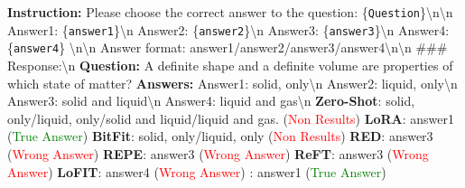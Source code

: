 \begin{tcolorbox}[colback=gray!10!white, colframe=black, title=Case 1: Commonsense Reasoning Task (ARC-c) on LLaMA-3.1-8B]
    \textbf{Instruction:} Please choose the correct answer to the question: \{\texttt{Question}\}\textbackslash{}n\textbackslash{}n Answer1: \{\texttt{answer1}\}\textbackslash{}n Answer2: \{\texttt{answer2}\}\textbackslash{}n Answer3: \{\texttt{answer3}\}\textbackslash{}n Answer4: \{\texttt{answer4}\} \textbackslash{}n\textbackslash{}n Answer format: answer1/answer2/answer3/answer4\textbackslash{}n\textbackslash{}n \#\#\# Response:\textbackslash{}n \newline
    \textbf{Question:} A definite shape and a definite volume are properties of which state of matter? \newline
    \textbf{Answers:} Answer1: solid, only\textbackslash{}n Answer2: liquid, only\textbackslash{}n Answer3: solid and liquid\textbackslash{}n Answer4: liquid and gas\textbackslash{}n
    \tcblower
    \textbf{Zero-Shot}: solid, only/liquid, only/solid and liquid/liquid and gas. (\textcolor{red}{Non Results}) \newline
    \textbf{LoRA}: answer1 (\textcolor{green}{True Answer}) \newline
    \textbf{BitFit}: solid, only/liquid, only (\textcolor{red}{Non Results}) \newline
    \textbf{RED}: answer3 (\textcolor{red}{Wrong Answer}) \newline
    \textbf{REPE}: answer3 (\textcolor{red}{Wrong Answer}) \newline
    \textbf{ReFT}: answer3 (\textcolor{red}{Wrong Answer}) \newline
    \textbf{LoFIT}: answer4 (\textcolor{red}{Wrong Answer}) \newline
    \textbf{\jola{}}: answer1 (\textcolor{green}{True Answer})
    \textbf{}
\end{tcolorbox}

